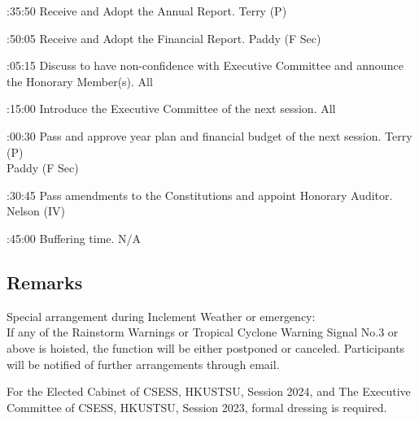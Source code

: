 \bTR{}:35:50
\eTD\bTD Receive and Adopt the Annual Report.
\eTD\bTD Terry (P)
\eTD\eTR

\bTR{}:50:05
\eTD\bTD Receive and Adopt the Financial Report.
\eTD\bTD Paddy (F Sec)
\eTD\eTR

\bTR{}:05:15
\eTD\bTD Discuss to have non-confidence with Executive Committee and announce the Honorary Member(s).
\eTD\bTD All
\eTD\eTR

\bTR{}:15:00
\eTD\bTD Introduce the Executive Committee of the next session.
\eTD\bTD All
\eTD\eTR

\bTR{}:00:30
\eTD\bTD Pass and approve year plan and financial budget of the next session.
\eTD\bTD Terry (P) \\ Paddy (F Sec)
\eTD\eTR

\bTR{}:30:45
\eTD\bTD Pass amendments to the Constitutions and appoint Honorary Auditor.
\eTD\bTD Nelson (IV)
\eTD\eTR

\bTR{}:45:00
\eTD\bTD Buffering time.
\eTD\bTD N/A
\eTD\eTR

\eTABLEbody
\eTABLE

\subsection{Remarks}
\startitemize
\item Special arrangement during Inclement Weather or emergency: \\
If any of the Rainstorm Warnings or Tropical Cyclone Warning Signal No.3 or above is hoisted, the function will be either postponed or canceled. Participants will be notified of further arrangements through email.
\item For the Elected Cabinet of CSESS, HKUSTSU, Session 2024, and The Executive Committee of CSESS, HKUSTSU, Session 2023, formal dressing is required.
\stopitemize

\pagebreak
